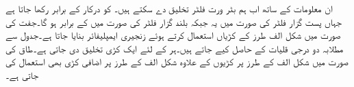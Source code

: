 ان معلومات کے ساتھ اب ہم بٹر ورت فلٹر تخلیق دے سکتے ہیں۔ کو درکار  کے برابر رکھا جاتا ہے جہاں پست گزار فلٹر کی صورت میں یہ  جبکہ بلند گزار فلٹر کی صورت میں  کے برابر ہو گا۔جفت  کی صورت میں شکل  الف طرز کے  کڑیاں استعمال کرتے ہوئے زنجیری ایمپلیفائر بنایا جاتا ہے۔جدول  سے مطلابہ دو درجی قلیات کے  حاصل کیے جاتے ہیں۔ہر  کے لئے ایک کڑی تخلیق دی جاتی ہے۔طاق  کی صورت میں شکل  الف کے طرز پر  کڑیوں کے علاوہ شکل  الف کے طرز پر اضافی کڑی بھی استعمال کی جاتی ہے۔
